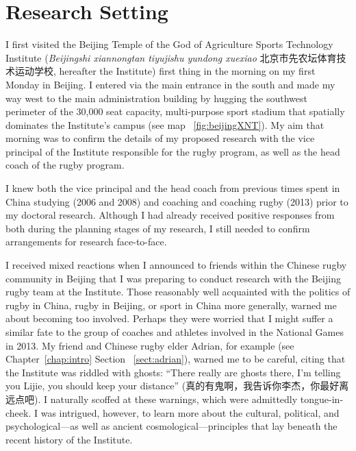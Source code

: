 
\begin{savequote}[8cm]

  \qauthor{}
\end{savequote}


\chapter{\label{chap:researchSetting}Research Setting}


\minitoc




                                          \begin{CJK}{UTF8}{gbsn}


I first visited the Beijing Temple of the God of Agriculture Sports Technology Institute (\textit{Beijingshi xiannongtan tiyujishu yundong xuexiao} 北京市先农坛体育技术运动学校,
hereafter the Institute) first thing in the morning on my first Monday in Beijing.  I entered via the main entrance in the south and made my way west to the main administration building by hugging the southwest perimeter of the 30,000 seat capacity, multi-purpose sport stadium that spatially dominates the Institute's campus (see map ~\ref{fig:beijingXNT}). My aim that morning was to confirm the details of my proposed research with the vice principal of the Institute responsible for the rugby program, as well as the head coach of the rugby program.

I knew both the vice principal and the head coach from previous times spent in China studying (2006 and 2008) and coaching and coaching rugby (2013) prior to my doctoral research.  Although I had already received positive responses from both during the planning stages of my research, I still needed to confirm arrangements for research face-to-face.

I received mixed reactions when I announced to friends within the Chinese rugby community in Beijing that I was preparing to conduct research with the Beijing rugby team at the Institute. Those reasonably well acquainted with the politics of rugby in China, rugby in Beijing, or sport in China more generally, warned me about becoming too involved.  Perhaps they were worried that I might suffer a similar fate to the group of coaches and athletes involved in the National Games in 2013.  My friend and Chinese rugby elder Adrian, for example (see Chapter~\ref{chap:intro} Section ~\ref{sect:adrian}), warned me to be careful, citing that the Institute was riddled with ghosts: ``There really are ghosts there, I'm telling you Lijie, you should keep your distance'' (真的有鬼啊，我告诉你李杰，你最好离远点吧).  I naturally scoffed at these warnings, which were admittedly tongue-in-cheek.  I was intrigued, however, to learn more about the cultural, political, and psychological---as well as ancient cosmological---principles that lay beneath the recent history of the Institute.


\end{CJK}
